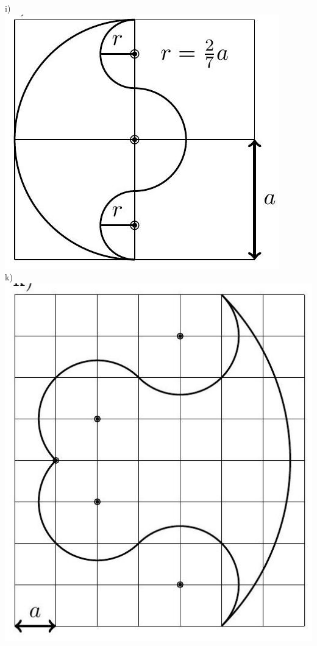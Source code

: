 \documentclass[10pt]{article}
\begin{document}
\begin{enumerate}
i)\\
\includegraphics[max width=\textwidth, center]{2024_11_21_e9b4faa005d5be2cc318g-061(2)}\\
k)\\
\includegraphics[max width=\textwidth, center]{2024_11_21_e9b4faa005d5be2cc318g-061(1)}\\

\end{enumerate}
\end{document}

